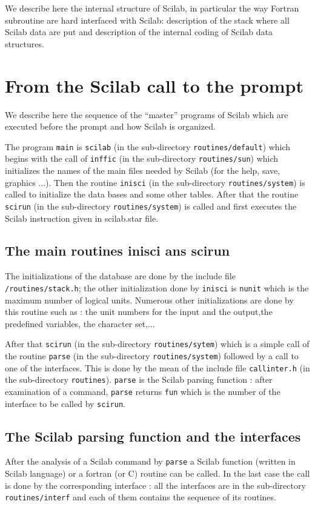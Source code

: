 
We describe here the internal structure of Scilab, in particular the way
Fortran subroutine are hard interfaced with Scilab: description of the stack 
where all Scilab data are put and description of the internal coding of
Scilab data structures.

\section{From the Scilab call to the prompt}
We describe here the sequence of the ``master'' programs of Scilab which are
executed before the prompt and how Scilab is organized.

The program {\tt main} is {\tt scilab} (in the sub-directory 
{\tt routines/default}) which  begins with the call of {\tt inffic} 
(in the sub-directory {\tt routines/sun}) which initializes the names of the 
main files
needed by Scilab (for the help, save, graphics ...). Then the routine 
{\tt inisci} (in the sub-directory {\tt routines/system}) is called 
to initialize the data bases and some other tables. After that  the routine 
{\tt scirun} (in the sub-directory {\tt routines/system}) is called
and first executes the Scilab instruction given in scilab.star file.

\subsection{The main routines inisci ans scirun}
The initializations of the database are done by the include file\\
{\tt <scilab dir>/routines/stack.h}; the other initialization done by 
{\tt inisci} is {\tt nunit} which is the maximum number of logical
units. Numerous other initializations are done by this routine 
such as : the unit numbers for the input and the output,the predefined 
variables, the character set,...

After that {\tt scirun}  (in the sub-directory
{\tt routines/sytem}) which is a simple call of the routine {\tt parse} (in
the sub-directory {\tt routines/system}) followed by a call to one of the interfaces. This is done by the mean of the include file 
{\tt callinter.h} (in the sub-directory {\tt routines}). {\tt parse} is the
Scilab parsing function : after examination of a command, {\tt parse} returns
{\tt fun} which is the number of the interface to be called by {\tt scirun}.

\subsection{The Scilab parsing function and the interfaces}
After the analysis of a Scilab command by {\tt parse} a Scilab function
(written in Scilab language) or a fortran (or C) routine can be called.
In the last case the call is done by the corresponding interface : all the
interfaces are in the sub-directory {\tt routines/interf} and each of them 
contains the sequence of its routines.

